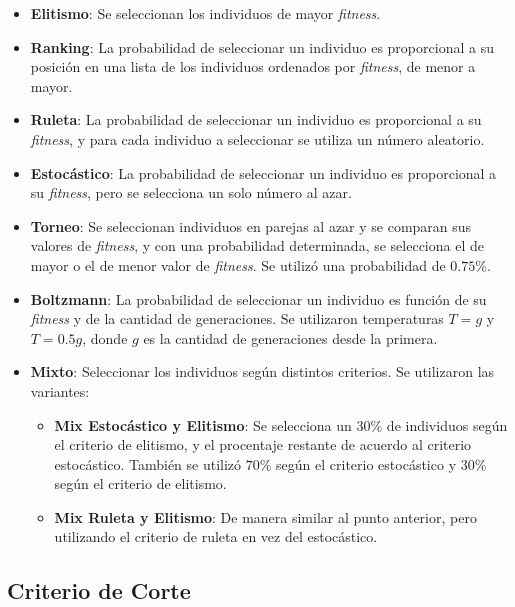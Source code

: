 \documentclass[letterpaper,twocolumn,10pt]{article}
\begin{document}
\begin{itemize}
    \item \textbf{Elitismo}: Se seleccionan los individuos de mayor \textit{fitness}.
    \item \textbf{Ranking}: La probabilidad de seleccionar un individuo es
        proporcional a su posición en una lista de los individuos ordenados por
        \textit{fitness}, de menor a mayor.
    \item \textbf{Ruleta}: La probabilidad de seleccionar un individuo es proporcional
        a su \textit{fitness}, y para cada individuo a seleccionar se utiliza un número
        aleatorio.
    \item \textbf{Estocástico}: La probabilidad de seleccionar un individuo es proporcional
        a su \textit{fitness}, pero se selecciona un solo número al azar.
    \item \textbf{Torneo}: Se seleccionan individuos en parejas al azar y se comparan sus
        valores de \textit{fitness}, y con una probabilidad determinada, se selecciona
        el de mayor o el de menor valor de \textit{fitness}. Se utilizó una probabilidad
        de $0.75\%$.
    \item \textbf{Boltzmann}: La probabilidad de seleccionar un individuo es función
        de su \textit{fitness} y de la cantidad de generaciones. Se utilizaron temperaturas
        $T=g$ y $T=0.5g$, donde $g$ es la cantidad de generaciones desde la primera.
    \item \textbf{Mixto}: Seleccionar los individuos según distintos criterios. Se
        utilizaron las variantes:
    \begin{itemize}
        \item \textbf{Mix Estocástico y Elitismo}: Se selecciona un $30\%$ de individuos
            según el criterio de elitismo, y el procentaje restante de acuerdo al criterio
            estocástico. También se utilizó $70\%$ según el criterio estocástico y $30\%$
            según el criterio de elitismo.
        \item \textbf{Mix Ruleta y Elitismo}: De manera similar al punto anterior, pero
            utilizando el criterio de ruleta en vez del estocástico.
    \end{itemize}
\end{itemize}

\subsection{Criterio de Corte}
\end{document}
